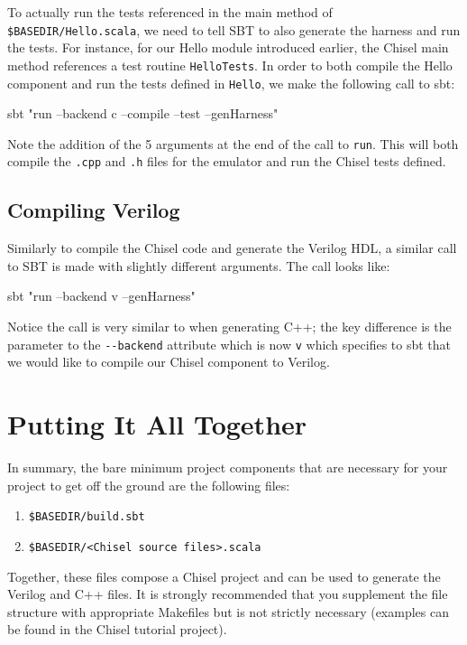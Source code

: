 To actually run the tests referenced in the main method of \verb+$BASEDIR/Hello.scala+, we need to tell SBT to also generate the harness and run the tests. For instance, for our Hello module introduced earlier, the Chisel main method references a test routine \verb+HelloTests+. In order to both compile the Hello component and run the tests defined in \verb+Hello+, we make the following call to sbt:

\begin{bash}
sbt "run --backend c --compile --test --genHarness"
\end{bash}

Note the addition of the 5 arguments at the end of the call to \verb+run+. This will both compile the \verb+.cpp+ and \verb+.h+ files for the emulator and run the Chisel tests defined. 

\subsection{Compiling Verilog}

Similarly to compile the Chisel code and generate the Verilog HDL, a similar call to SBT is made with slightly different arguments. The call looks like:

\begin{bash}
sbt "run --backend v --genHarness"
\end{bash}

Notice the call is very similar to when generating C++; the key difference is the parameter to the \verb+--backend+ attribute which is now \verb+v+ which specifies to sbt that we would like to compile our Chisel component to Verilog. 

\section{Putting It All Together}

In summary, the bare minimum project components that are necessary for your project to get off the ground are the following files:

\begin{enumerate}
\item \verb+$BASEDIR/build.sbt+
\item \verb+$BASEDIR/<Chisel source files>.scala+
\end{enumerate}

Together, these files compose a Chisel project and can be used to generate the Verilog and C++ files. It is strongly recommended that you supplement the file structure with appropriate Makefiles but is not strictly necessary (examples can be found in the Chisel tutorial project).

